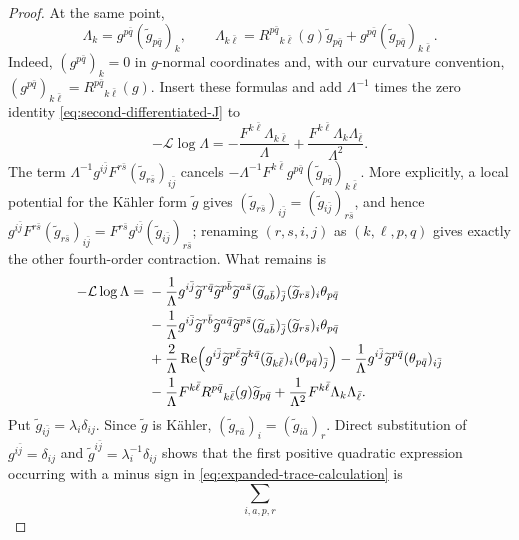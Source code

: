 \documentclass[reqno]{amsart}
\theoremstyle{plain}
\theoremstyle{remark}
\begin{document}
\begin{proof}
At the same point,
\[
 \Lambda_k=g^{p\bar q}(\widetilde g_{p\bar q})_k,
 \qquad
 \Lambda_{k\bar\ell}
 =R^{p\bar q}{}_{k\bar\ell}(g)\widetilde g_{p\bar q}
  +g^{p\bar q}(\widetilde g_{p\bar q})_{k\bar\ell}.
\]
Indeed, $(g^{p\bar q})_k=0$ in $g$-normal coordinates and, with
our curvature convention,
$(g^{p\bar q})_{k\bar\ell}=R^{p\bar q}{}_{k\bar\ell}(g)$.
Insert these formulas and add $\Lambda^{-1}$ times the zero identity
\eqref{eq:second-differentiated-J} to
\[
 -\mathcal L\log\Lambda
 =-\frac{F^{k\bar\ell}\Lambda_{k\bar\ell}}{\Lambda}
  +\frac{F^{k\bar\ell}\Lambda_k\Lambda_{\bar\ell}}{\Lambda^2}.
\]
The term
$\Lambda^{-1}g^{i\bar j}F^{r\bar s}
(\widetilde g_{r\bar s})_{i\bar j}$ cancels
$-\Lambda^{-1}F^{k\bar\ell}g^{p\bar q}
(\widetilde g_{p\bar q})_{k\bar\ell}$.  More explicitly, a local
potential for the K\"ahler form $\widetilde g$ gives
$(\widetilde g_{r\bar s})_{i\bar j}
=(\widetilde g_{i\bar j})_{r\bar s}$, and hence
$g^{i\bar j}F^{r\bar s}(\widetilde g_{r\bar s})_{i\bar j}
=F^{r\bar s}g^{i\bar j}(\widetilde g_{i\bar j})_{r\bar s}$;
renaming $(r,s,i,j)$ as $(k,\ell,p,q)$ gives exactly the other
fourth-order contraction.  What remains is
\begin{align}
-\mathcal L\log\Lambda={}&
-\frac1\Lambda g^{i\bar j}\widetilde g^{r\bar q}
 \widetilde g^{p\bar b}\widetilde g^{a\bar s}
 (\widetilde g_{a\bar b})_{\bar j}
 (\widetilde g_{r\bar s})_i\theta_{p\bar q}\notag\\
&-\frac1\Lambda g^{i\bar j}\widetilde g^{r\bar b}
 \widetilde g^{a\bar q}\widetilde g^{p\bar s}
 (\widetilde g_{a\bar b})_{\bar j}
 (\widetilde g_{r\bar s})_i\theta_{p\bar q}\notag\\
&+\frac2\Lambda\operatorname{Re}\!\left(
 g^{i\bar j}\widetilde g^{p\bar\ell}
 \widetilde g^{k\bar q}(\widetilde g_{k\bar\ell})_i
 (\theta_{p\bar q})_{\bar j}\right)
 -\frac1\Lambda g^{i\bar j}\widetilde g^{p\bar q}
 (\theta_{p\bar q})_{i\bar j}\notag\\
&-\frac1\Lambda F^{k\bar\ell}
 R^{p\bar q}{}_{k\bar\ell}(g)\widetilde g_{p\bar q}
 +\frac1{\Lambda^2}F^{k\bar\ell}
 \Lambda_k\Lambda_{\bar\ell}.
\label{eq:expanded-trace-calculation}
\end{align}
Put
$\widetilde g_{i\bar j}=\lambda_i\delta_{ij}$.  Since
$\widetilde g$ is K\"ahler,
$(\widetilde g_{r\bar a})_i=(\widetilde g_{i\bar a})_r$.
Direct substitution of $g^{i\bar j}=\delta_{ij}$ and
$\widetilde g^{i\bar j}=\lambda_i^{-1}\delta_{ij}$ shows that the
first positive quadratic expression occurring with a minus sign in
\eqref{eq:expanded-trace-calculation} is
\[
 \sum_{i,a,p,r}
\]
\end{proof}
\end{document}
